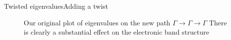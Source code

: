 \documentclass[9pt]{beamer}
\begin{document}
\begin{frame}{Twisted eigenvalues}{Adding a twist}
  \begin{figure}
  \centering
    \caption{Our original plot of eigenvalues on the new path $\Gamma \rightarrow \Gamma \rightarrow \Gamma$ There is clearly a substantial effect on the electronic band structure}
  \end{figure}
\end{frame}
\end{document}
